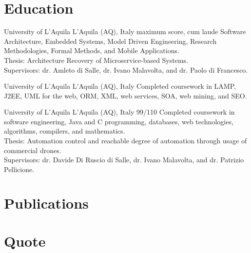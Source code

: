 \documentclass[10pt,a4paper,sans]{moderncv} %
\begin{document}
\section{Education}
{University of L'Aquila}
{L'Aquila (AQ), Italy}
{maximum score, cum laude}{
Software Architecture, Embedded Systems, Model Driven Engineering, Research Methodologies, Formal Methods, and Mobile Applications.
\\ Thesis: Architecture Recovery of Microservice-based Systems.
\\ Supervisors: dr. Amleto di Salle, dr. Ivano Malavolta, and dr. Paolo di Francesco.
}

{University of L'Aquila}
{L'Aquila (AQ), Italy}
{}{
Completed coursework in LAMP, J2EE, UML for the web, ORM, XML, web services, SOA, web mining, and SEO.
}

{University of L'Aquila}
{L'Aquila (AQ), Italy}
{99/110}{
Completed coursework in software engineering, Java and C programming, databases, web technologies, algorithms, compilers, and mathematics.
\\ Thesis: Automation control and reachable degree of automation through usage of commercial drones.
\\ Supervisors: dr. Davide Di Ruscio di Salle, dr. Ivano Malavolta, and dr. Patrizio Pellicione.
}

\section{Publications}

\section{Quote}
\end{document}

